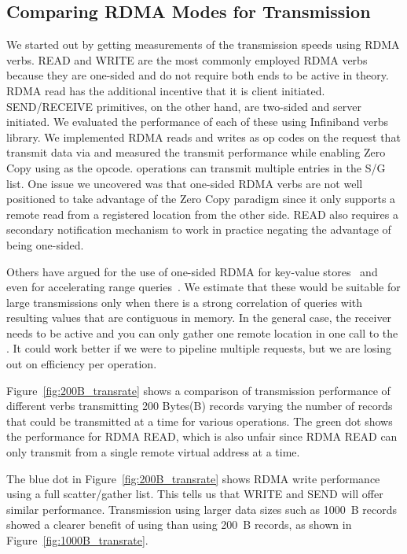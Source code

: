 \subsection{Comparing RDMA Modes for Transmission}
We started out by getting measurements of the transmission speeds using RDMA verbs.  
READ and WRITE are the most commonly employed RDMA verbs because they are one-sided
and do not require both ends to be active in theory. RDMA read has the additional incentive 
that it is client initiated. SEND/RECEIVE primitives, on the other hand, are two-sided and 
server initiated.  We evaluated the performance of each of these using Infiniband verbs library. We implemented 
RDMA reads and writes as op codes on the  request that 
transmit data via  and measured the transmit 
performance while enabling Zero Copy using  as the opcode.
 operations can transmit multiple entries in the S/G list.
One issue we uncovered was that one-sided RDMA verbs are not well positioned to 
take advantage of the Zero Copy paradigm since it only supports a remote read 
from a registered location from the other side. READ also requires a secondary notification mechanism 
to work in practice negating the advantage of being one-sided.

Others have argued for the use of one-sided RDMA for key-value stores~\cite{pilaf} and even for accelerating 
range queries~\cite{zerocopyrangequery}. We estimate that these would be suitable for large transmissions only when there is a strong 
correlation of queries with resulting values that are contiguous in memory. In the general case, the receiver 
needs to be active and you can only gather one remote location in one call to the .
It could work better if we were to pipeline multiple requests, but we are losing out on efficiency per operation.

Figure~\ref{fig:200B_transrate} shows a comparison of transmission
performance of different verbs transmitting 200 Bytes(B) records varying the number of records
that could be transmitted at a time for various operations. The green dot shows
the performance for RDMA READ, which is also unfair since RDMA READ can only transmit from a single remote virtual address at a time.

The blue dot in Figure~\ref{fig:200B_transrate} shows RDMA write performance using a full scatter/gather list. This tells us that WRITE and SEND will offer 
similar performance. Transmission using larger data sizes such as 1000~B records showed a clearer benefit of using  than 
using 200~B records, as shown in Figure~\ref{fig:1000B_transrate}. 

